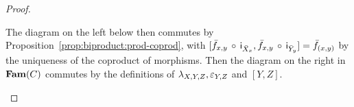 \begin{proof}
\begin{enumerate}
The diagram on the left below then commutes by Proposition~\ref{prop:biproduct:prod-coprod}, with
$[\bar{f}_{x,y}\,\circ\,\mathsf{i}_{\bar{X}_x}, \bar{f}_{x,y}\,\circ\,\mathsf{i}_{\bar{Y}_y}] =
\bar{f}_{(x,y)}$ by the uniqueness of the coproduct of morphisms. Then the diagram on the right in $\mathbf{Fam}(C)$
commutes by the definitions of $\lambda_{X,Y,Z}, \varepsilon_{Y,Z}$ and $[Y,Z]$.

\begin{center}
\hspace{1cm}
\end{center}
\end{enumerate}
\end{proof}
